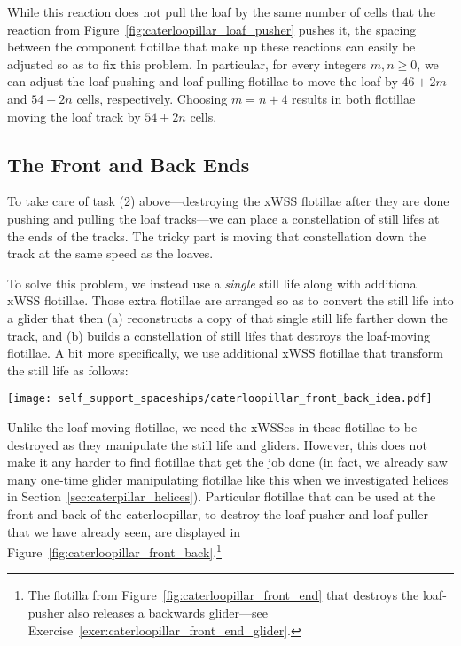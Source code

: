 While this reaction does not pull the loaf by the same number of cells that the reaction from Figure~\ref{fig:caterloopillar_loaf_pusher} pushes it, the spacing between the component flotillae that make up these reactions can easily be adjusted so as to fix this problem. In particular, for every integers $m,n \geq 0$, we can adjust the loaf-pushing and loaf-pulling flotillae to move the loaf by $46 + 2m$ and $54 + 2n$ cells, respectively. Choosing $m = n + 4$ results in both flotillae moving the loaf track by $54 + 2n$ cells.


\subsection{The Front and Back Ends}\label{sec:caterloopillar_front_and_back}

To take care of task (2) above---destroying the xWSS flotillae after they are done pushing and pulling the loaf tracks---we can place a constellation of still lifes at the ends of the tracks. The tricky part is moving that constellation down the track at the same speed as the loaves.

To solve this problem, we instead use a \emph{single} still life along with additional xWSS flotillae. Those extra flotillae are arranged so as to convert the still life into a glider that then (a) reconstructs a copy of that single still life farther down the track, and (b) builds a constellation of still lifes that destroys the loaf-moving flotillae. A bit more specifically, we use additional xWSS flotillae that transform the still life as follows:

\noindent\begin{center}
	\centering
	\texttt{[image: self\_support\_spaceships/caterloopillar\_front\_back\_idea.pdf]}
\end{center}

Unlike the loaf-moving flotillae, we need the xWSSes in these flotillae to be destroyed as they manipulate the still life and gliders. However, this does not make it any harder to find flotillae that get the job done (in fact, we already saw many one-time glider manipulating flotillae like this when we investigated helices in Section~\ref{sec:caterpillar_helices}). Particular flotillae that can be used at the front and back of the caterloopillar, to destroy the loaf-pusher and loaf-puller that we have already seen, are displayed in Figure~\ref{fig:caterloopillar_front_back}.\footnote{The flotilla from Figure~\ref{fig:caterloopillar_front_end} that destroys the loaf-pusher also releases a backwards glider---see Exercise~\ref{exer:caterloopillar_front_end_glider}.}

